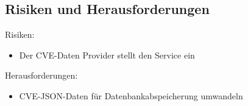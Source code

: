 \subsection{Risiken und Herausforderungen} \label{sec:Risiken und Herausforderungen}
Risiken:
\begin{itemize}
    \item Der CVE-Daten Provider stellt den Service ein
\end{itemize}
Herausforderungen:
\begin{itemize}
    \item CVE-JSON-Daten für Datenbankabspeicherung umwandeln
\end{itemize}